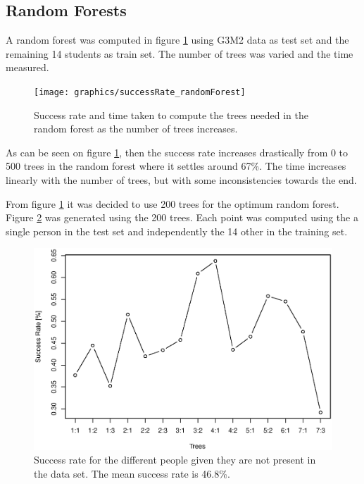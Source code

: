 \subsection{Random Forests}

A random forest was computed in figure \ref{fig:success_time_vs_trees_randomForest} using G3M2 data as test set and the remaining 14 students as train set.
The number of trees was varied and the time measured.

\begin{figure}[H]
\centering
\texttt{[image: graphics/successRate\_randomForest]}
\caption{Success rate and time taken to compute the trees needed in the random forest as the number of trees increases.}
\label{fig:success_time_vs_trees_randomForest}
\end{figure}

As can be seen on figure \ref{fig:success_time_vs_trees_randomForest}, then the success rate increases drastically from 0 to 500 trees in the random forest where it settles around 67\%.
The time increases linearly with the number of trees, but with some inconsistencies towards the end.

From figure \ref{fig:success_time_vs_trees_randomForest} it was decided to use 200 trees for the optimum random forest.
Figure \ref{fig:success_randomForest} was generated using the 200 trees.
Each point was computed using the a single person in the test set and independently the 14 other in the training set.

\begin{figure}[H]
\centering
\includegraphics[width = 0.95 \textwidth]{graphics/successRate_randomForest_comp}
\caption{Success rate for the different people given they are not present in the data set. The mean success rate is 46.8\%.}
\label{fig:success_randomForest}
\end{figure}